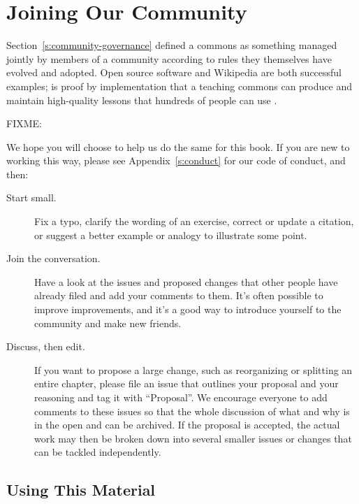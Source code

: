 \chapter{Joining Our Community}\label{s:joining}

Section~\ref{s:community-governance} defined a commons as
something managed jointly by members of a community
according to rules they themselves have evolved and adopted.
Open source software and Wikipedia are both successful examples;
 is proof by implementation that
a teaching commons can produce and maintain high-quality lessons
that hundreds of people can use \cite{Wils2016}.

FIXME: \cite{Deve2018}

We hope you will choose to help us do the same for this book.
If you are new to working this way,
please see Appendix~\ref{s:conduct} for our code of conduct,
and then:

\begin{description}

\item[Start small.]
  Fix a typo,
  clarify the wording of an exercise,
  correct or update a citation,
  or suggest a better example or analogy to illustrate some point.

\item[Join the conversation.]
  Have a look at the issues and proposed changes that other people have already filed
  and add your comments to them.
  It's often possible to improve improvements,
  and it's a good way to introduce yourself to the community and make new friends.

\item[Discuss, then edit.]
  If you want to propose a large change,
  such as reorganizing or splitting an entire chapter,
  please file an issue that outlines your proposal and your reasoning and tag it with ``Proposal''.
  We encourage everyone to add comments to these issues
  so that the whole discussion of what and why is in the open and can be archived.
  If the proposal is accepted,
  the actual work may then be broken down into several smaller issues or changes
  that can be tackled independently.

\end{description}

\section{Using This Material}\label{s:joining-using}

